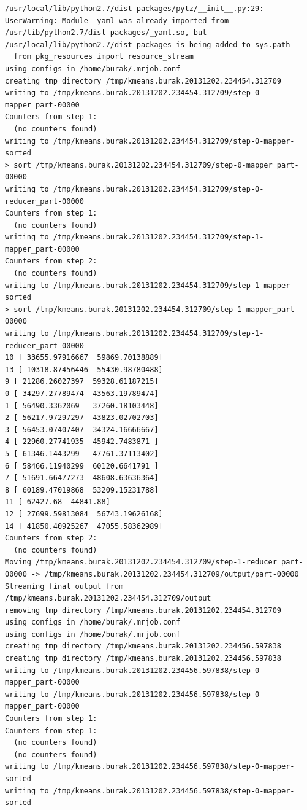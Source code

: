 \documentclass[12pt,fleqn]{article}\usepackage{../../common}
\begin{document}
\begin{verbatim}
/usr/local/lib/python2.7/dist-packages/pytz/__init__.py:29: UserWarning: Module _yaml was already imported from /usr/lib/python2.7/dist-packages/_yaml.so, but /usr/local/lib/python2.7/dist-packages is being added to sys.path
  from pkg_resources import resource_stream
using configs in /home/burak/.mrjob.conf
creating tmp directory /tmp/kmeans.burak.20131202.234454.312709
writing to /tmp/kmeans.burak.20131202.234454.312709/step-0-mapper_part-00000
Counters from step 1:
  (no counters found)
writing to /tmp/kmeans.burak.20131202.234454.312709/step-0-mapper-sorted
> sort /tmp/kmeans.burak.20131202.234454.312709/step-0-mapper_part-00000
writing to /tmp/kmeans.burak.20131202.234454.312709/step-0-reducer_part-00000
Counters from step 1:
  (no counters found)
writing to /tmp/kmeans.burak.20131202.234454.312709/step-1-mapper_part-00000
Counters from step 2:
  (no counters found)
writing to /tmp/kmeans.burak.20131202.234454.312709/step-1-mapper-sorted
> sort /tmp/kmeans.burak.20131202.234454.312709/step-1-mapper_part-00000
writing to /tmp/kmeans.burak.20131202.234454.312709/step-1-reducer_part-00000
10 [ 33655.97916667  59869.70138889]
13 [ 10318.87456446  55430.98780488]
9 [ 21286.26027397  59328.61187215]
0 [ 34297.27789474  43563.19789474]
1 [ 56490.3362069   37260.18103448]
2 [ 56217.97297297  43823.02702703]
3 [ 56453.07407407  34324.16666667]
4 [ 22960.27741935  45942.7483871 ]
5 [ 61346.1443299   47761.37113402]
6 [ 58466.11940299  60120.6641791 ]
7 [ 51691.66477273  48608.63636364]
8 [ 60189.47019868  53209.15231788]
11 [ 62427.68  44841.88]
12 [ 27699.59813084  56743.19626168]
14 [ 41850.40925267  47055.58362989]
Counters from step 2:
  (no counters found)
Moving /tmp/kmeans.burak.20131202.234454.312709/step-1-reducer_part-00000 -> /tmp/kmeans.burak.20131202.234454.312709/output/part-00000
Streaming final output from /tmp/kmeans.burak.20131202.234454.312709/output
removing tmp directory /tmp/kmeans.burak.20131202.234454.312709
using configs in /home/burak/.mrjob.conf
using configs in /home/burak/.mrjob.conf
creating tmp directory /tmp/kmeans.burak.20131202.234456.597838
creating tmp directory /tmp/kmeans.burak.20131202.234456.597838
writing to /tmp/kmeans.burak.20131202.234456.597838/step-0-mapper_part-00000
writing to /tmp/kmeans.burak.20131202.234456.597838/step-0-mapper_part-00000
Counters from step 1:
Counters from step 1:
  (no counters found)
  (no counters found)
writing to /tmp/kmeans.burak.20131202.234456.597838/step-0-mapper-sorted
writing to /tmp/kmeans.burak.20131202.234456.597838/step-0-mapper-sorted

\end{verbatim}
\end{document}
